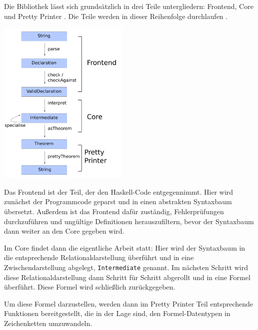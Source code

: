 Die Bibliothek lässt sich grundsätzlich in drei Teile untergliedern: Frontend, Core und Pretty Printer \cite{freetheorems}. Die
Teile werden in dieser Reihenfolge durchlaufen .

\includegraphics[height=300px]{overview-free-theorems}

Das Frontend ist der Teil, der den Haskell-Code entgegennimmt. Hier wird zunächst der Programmcode geparst und in einen
abstrakten Syntaxbaum übersetzt. Außerdem ist das Frontend dafür zuständig, Fehlerprüfungen durchzuführen und
ungültige Definitionen herauszufiltern, bevor der Syntaxbaum dann weiter an den Core gegeben wird.


Im Core findet dann die eigentliche Arbeit statt: Hier wird der Syntaxbaum in die entsprechende Relationaldarstellung
überführt und in eine Zwischendarstellung abgelegt, \texttt{Intermediate} genannt. Im nächsten Schritt wird diese
Relationaldarstellung dann Schritt für Schritt abgerollt und in eine Formel überführt. Diese Formel wird schließlich zurückgegeben.

Um diese Formel darzustellen, werden dann im Pretty Printer Teil entsprechende Funktionen bereitgestellt, die in der Lage
sind, den Formel-Datentypen in Zeichenketten umzuwandeln.




